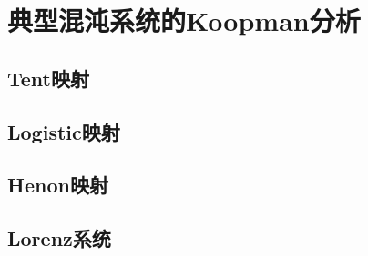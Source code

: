 \chapter{典型混沌系统的Koopman分析}

\section{Tent映射}

\section{Logistic映射}

\section{Henon映射}

\section{Lorenz系统}

% 
% 
